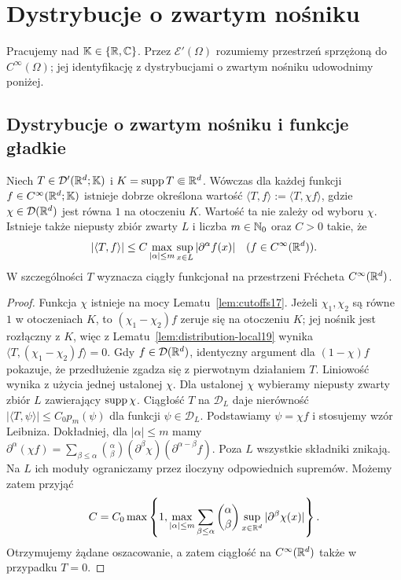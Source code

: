 \section{Dystrybucje o zwartym nośniku}
\providecommand{\atlasref}[2]{#2}

Pracujemy nad $\mathbb K\in\{\mathbb R,\mathbb C\}$. Przez $\mathcal E'(\Omega)$ rozumiemy przestrzeń sprzężoną do $C^\infty(\Omega)$; jej identyfikację z dystrybucjami o zwartym nośniku udowodnimy poniżej.

\subsection{Dystrybucje o zwartym nośniku i funkcje gładkie}

\begin{lemat}
\label{lem:compact-action21}
Niech $T\in\mathcal D'(\mathbb R^d;\mathbb K)$ i
$K=\operatorname{supp} T\Subset\mathbb R^d$. Wówczas dla każdej funkcji
$f\in C^\infty(\mathbb R^d;\mathbb K)$ istnieje dobrze określona wartość
$\langle T,f\rangle:=\langle T,\chi f\rangle$, gdzie
$\chi\in\mathcal D(\mathbb R^d)$ jest równa $1$ na otoczeniu $K$.
Wartość ta nie zależy od wyboru $\chi$. Istnieje także
niepusty zbiór zwarty $L$ i liczba $m\in\mathbb N_0$ oraz $C>0$ takie, że
\[
 |\langle T,f\rangle|\le
 C\max_{|\alpha|\le m}\sup_{x\in L}|\partial^\alpha f(x)|
 \quad(f\in C^\infty(\mathbb R^d)).
\]
W szczególności $T$ wyznacza ciągły funkcjonał na
przestrzeni Frécheta $C^\infty(\mathbb R^d)$.
\end{lemat}
\begin{proof}
Funkcja $\chi$ istnieje na mocy Lematu~\ref{lem:cutoffs17}.
Jeżeli $\chi_1,\chi_2$ są równe $1$ w otoczeniach $K$,
to $(\chi_1-\chi_2)f$ zeruje się na otoczeniu $K$;
jej nośnik jest rozłączny z $K$, więc z Lematu~\ref{lem:distribution-local19}
wynika $\langle T,(\chi_1-\chi_2)f\rangle=0$.
Gdy $f\in\mathcal D(\mathbb R^d)$, identyczny argument dla
$(1-\chi)f$ pokazuje, że przedłużenie zgadza się z pierwotnym
działaniem $T$. Liniowość wynika z użycia jednej ustalonej $\chi$.
Dla ustalonej $\chi$ wybieramy niepusty zwarty zbiór $L$
zawierający $\operatorname{supp}\chi$.
Ciągłość $T$ na $\mathcal D_L$ daje nierówność
$|\langle T,\psi\rangle|\le C_0p_m(\psi)$ dla funkcji
$\psi\in\mathcal D_L$. Podstawiamy $\psi=\chi f$
i stosujemy wzór Leibniza. Dokładniej, dla $|\alpha|\le m$ mamy
$\partial^\alpha(\chi f)=\sum_{\beta\le\alpha}
\binom\alpha\beta(\partial^\beta\chi)(\partial^{\alpha-\beta}f)$.
Poza $L$ wszystkie składniki znikają. Na $L$ ich moduły
ograniczamy przez iloczyny odpowiednich supremów.
Możemy zatem przyjąć
\[
 C=C_0\max\left\{1,\max_{|\alpha|\le m}
 \sum_{\beta\le\alpha}\binom\alpha\beta
 \sup_{x\in\mathbb R^d}|\partial^\beta\chi(x)|\right\}.
\]
Otrzymujemy żądane oszacowanie, a zatem ciągłość na
$C^\infty(\mathbb R^d)$ także w przypadku $T=0$.
\end{proof}

